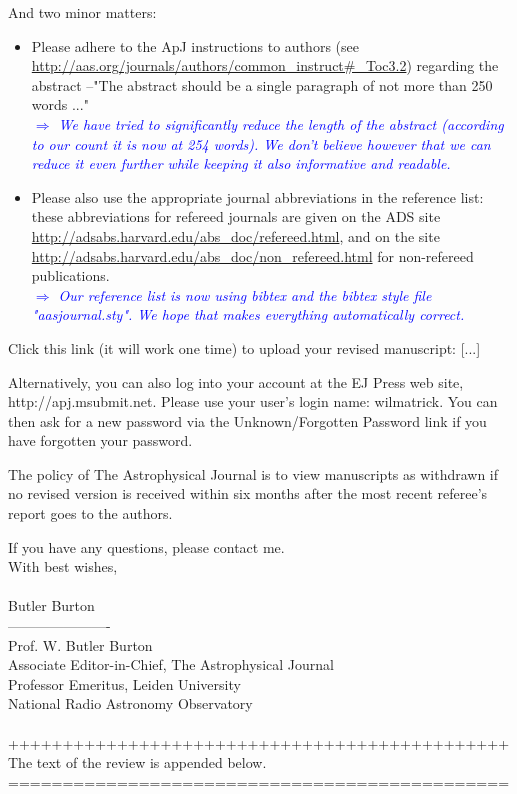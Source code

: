 \documentclass[10pt,a4paper]{article}
\newcommand{\Comment}[1]{\textsl{\textcolor{Blue}{$\Longrightarrow$ {#1}}}}
\begin{document}
And two minor matters: 
\begin{itemize}
\item Please adhere to the ApJ instructions to authors (see\\ \url{http://aas.org/journals/authors/common_instruct#_Toc3.2}) regarding the abstract --"The abstract should be a single paragraph of not more than 250 words ..." \\\Comment{We have tried to significantly reduce the length of the abstract (according to our count it is now at 254 words). We don't believe however that we can reduce it even further while keeping it also informative and readable.}
\item Please also use the appropriate journal abbreviations in the reference list: these abbreviations for refereed journals are given on the ADS site \url{http://adsabs.harvard.edu/abs_doc/refereed.html}, and on the site
\url{http://adsabs.harvard.edu/abs_doc/non_refereed.html} for non-refereed publications. \\\Comment{Our reference list is now using bibtex and the bibtex style file "aasjournal.sty". We hope that makes everything automatically correct.}
\end{itemize}

Click this link (it will work one time) to upload your revised manuscript: [...]

Alternatively, you can also log into your account at the EJ Press web site,
http://apj.msubmit.net.  Please use your user's login name: wilmatrick.  You can
then ask for a new password via the Unknown/Forgotten Password link if you have
forgotten your password. 

The policy of The Astrophysical Journal is to view manuscripts as withdrawn if no
revised version is received within six months after the most recent referee's report
goes to the authors.

If you have any questions, please contact me.\\


\noindent With best wishes,\\\\
Butler Burton\\
----------------------\\
Prof. W. Butler Burton\\
Associate Editor-in-Chief, The Astrophysical Journal\\
Professor Emeritus, Leiden University\\
National Radio Astronomy Observatory\\
\\++++++++++++++++++++++++++++++++++++++++++++++\\
The text of the review is appended below.\\
==============================================\\\\ 
  
\end{document}
